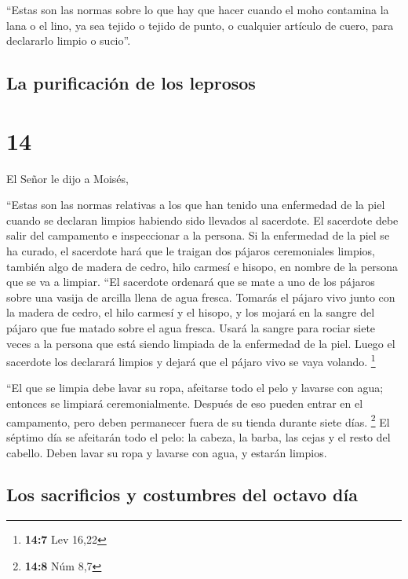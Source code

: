  ``Estas son las normas sobre lo que hay que hacer cuando
el moho contamina la lana o el lino, ya sea tejido o tejido de punto, o
cualquier artículo de cuero, para declararlo limpio o sucio''.

\hypertarget{la-purificaciuxf3n-de-los-leprosos}{%
\subsection{La purificación de los
leprosos}\label{la-purificaciuxf3n-de-los-leprosos}}

\hypertarget{section-13}{%
\section{14}\label{section-13}}

 El Señor le dijo a Moisés,

 ``Estas son las normas relativas a los que han tenido una
enfermedad de la piel cuando se declaran limpios habiendo sido llevados
al sacerdote.  El sacerdote debe salir del campamento e
inspeccionar a la persona. Si la enfermedad de la piel se ha curado,
 el sacerdote hará que le traigan dos pájaros ceremoniales
limpios, también algo de madera de cedro, hilo carmesí e hisopo, en
nombre de la persona que se va a limpiar.  ``El sacerdote
ordenará que se mate a uno de los pájaros sobre una vasija de arcilla
llena de agua fresca.  Tomarás el pájaro vivo junto con la
madera de cedro, el hilo carmesí y el hisopo, y los mojará en la sangre
del pájaro que fue matado sobre el agua fresca.  Usará la
sangre para rociar siete veces a la persona que está siendo limpiada de
la enfermedad de la piel. Luego el sacerdote los declarará limpios y
dejará que el pájaro vivo se vaya volando. \footnote{\textbf{14:7} Lev
  16,22}

 ``El que se limpia debe lavar su ropa, afeitarse todo el
pelo y lavarse con agua; entonces se limpiará ceremonialmente. Después
de eso pueden entrar en el campamento, pero deben permanecer fuera de su
tienda durante siete días. \footnote{\textbf{14:8} Núm 8,7}
 El séptimo día se afeitarán todo el pelo: la cabeza, la
barba, las cejas y el resto del cabello. Deben lavar su ropa y lavarse
con agua, y estarán limpios.

\hypertarget{los-sacrificios-y-costumbres-del-octavo-duxeda}{%
\subsection{Los sacrificios y costumbres del octavo
día}\label{los-sacrificios-y-costumbres-del-octavo-duxeda}}

